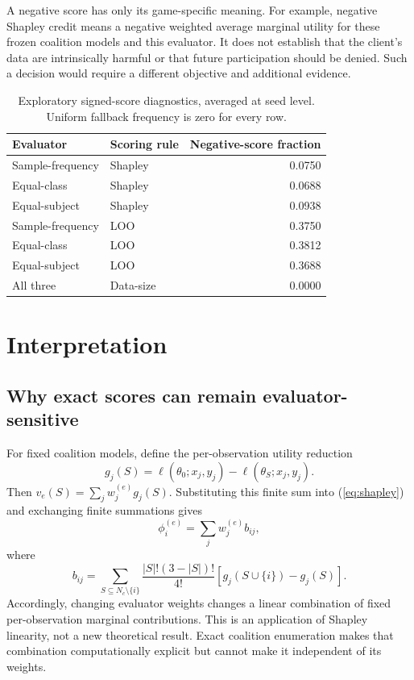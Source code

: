 \documentclass[conference,letterpaper]{IEEEtran}
\begin{document}
A negative score has only its game-specific meaning. For example, negative Shapley credit means a negative weighted average marginal utility for these frozen coalition models and this evaluator. It does not establish that the client's data are intrinsically harmful or that future participation should be denied. Such a decision would require a different objective and additional evidence.

\begin{table}[t]
\caption{Exploratory signed-score diagnostics, averaged at seed level. Uniform fallback frequency is zero for every row.}
\label{tab:negative}\centering\small
\begin{tabular}{llr}\toprule
Evaluator & Scoring rule & Negative-score fraction\\\midrule
Sample-frequency & Shapley & 0.0750\\
Equal-class & Shapley & 0.0688\\
Equal-subject & Shapley & 0.0938\\
Sample-frequency & LOO & 0.3750\\
Equal-class & LOO & 0.3812\\
Equal-subject & LOO & 0.3688\\
All three & Data-size & 0.0000\\\bottomrule
\end{tabular}
\end{table}

\section{Interpretation}
\subsection{Why exact scores can remain evaluator-sensitive}
For fixed coalition models, define the per-observation utility reduction
\begin{equation}
g_j(S)=\ell(\theta_0;x_j,y_j)-\ell(\theta_S;x_j,y_j).
\end{equation}
Then $v_e(S)=\sum_j w_j^{(e)}g_j(S)$. Substituting this finite sum into (\ref{eq:shapley}) and exchanging finite summations gives
\begin{equation}
\phi_i^{(e)}=\sum_j w_j^{(e)}b_{ij},
\end{equation}
where
\begin{equation}
b_{ij}=\sum_{S\subseteq N_c\setminus\{i\}}
\frac{|S|!(3-|S|)!}{4!}[g_j(S\cup\{i\})-g_j(S)].
\end{equation}
Accordingly, changing evaluator weights changes a linear combination of fixed per-observation marginal contributions. This is an application of Shapley linearity, not a new theoretical result. Exact coalition enumeration makes that combination computationally explicit but cannot make it independent of its weights.
\end{document}
